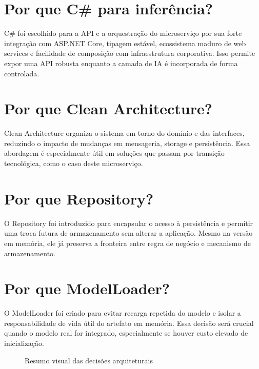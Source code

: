 \section{Por que C# para inferência?}

C# foi escolhido para a API e a orquestração do microserviço por sua forte integração com ASP.NET Core, tipagem estável, ecossistema maduro de web services e facilidade de composição com infraestrutura corporativa. Isso permite expor uma API robusta enquanto a camada de IA é incorporada de forma controlada.

\section{Por que Clean Architecture?}

Clean Architecture organiza o sistema em torno do domínio e das interfaces, reduzindo o impacto de mudanças em mensageria, storage e persistência. Essa abordagem é especialmente útil em soluções que passam por transição tecnológica, como o caso deste microserviço.

\section{Por que Repository?}

O Repository foi introduzido para encapsular o acesso à persistência e permitir uma troca futura de armazenamento sem alterar a aplicação. Mesmo na versão em memória, ele já preserva a fronteira entre regra de negócio e mecanismo de armazenamento.

\section{Por que ModelLoader?}

O ModelLoader foi criado para evitar recarga repetida do modelo e isolar a responsabilidade de vida útil do artefato em memória. Essa decisão será crucial quando o modelo real for integrado, especialmente se houver custo elevado de inicialização.

\begin{figure}[H]
    \centering
    \caption{Resumo visual das decisões arquiteturais}
    \label{fig:decisoes-arquiteturais}
\end{figure}
